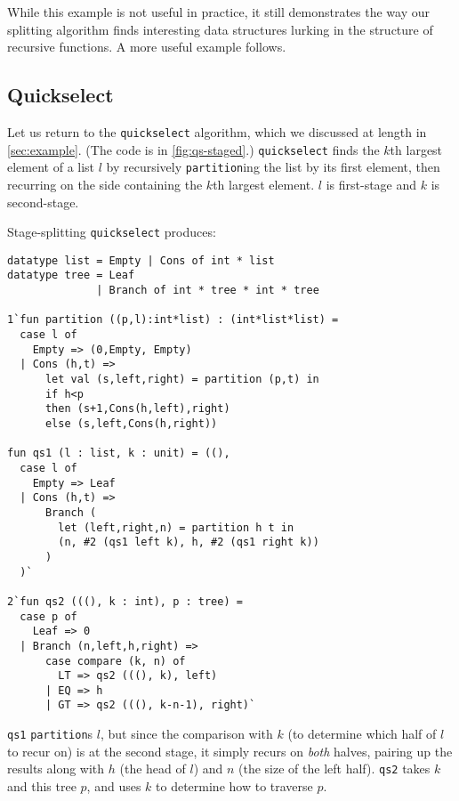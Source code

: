 While this example is not useful in practice, it still demonstrates the way our
splitting algorithm finds interesting data structures lurking in the structure
of recursive functions. A more useful example follows.


\subsection{Quickselect}

Let us return to the \texttt{quickselect} algorithm, which we discussed at
length in \ref{sec:example}. (The code is in \ref{fig:qs-staged}.)
\texttt{quickselect} finds the $k$th largest element of a list $l$ by
recursively \texttt{partition}ing the list by its first element, then recurring
on the side containing the $k$th largest element. $l$ is first-stage and $k$ is
second-stage.

Stage-splitting \texttt{quickselect} produces:
%
\begin{lstlisting} 
datatype list = Empty | Cons of int * list
datatype tree = Leaf
              | Branch of int * tree * int * tree

1`fun partition ((p,l):int*list) : (int*list*list) = 
  case l of 
    Empty => (0,Empty, Empty) 
  | Cons (h,t) => 
      let val (s,left,right) = partition (p,t) in 
      if h<p 
      then (s+1,Cons(h,left),right) 
      else (s,left,Cons(h,right))

fun qs1 (l : list, k : unit) = ((), 
  case l of
    Empty => Leaf
  | Cons (h,t) => 
      Branch (
        let (left,right,n) = partition h t in
        (n, #2 (qs1 left k), h, #2 (qs1 right k))
      )
  )`

2`fun qs2 (((), k : int), p : tree) = 
  case p of
    Leaf => 0
  | Branch (n,left,h,right) =>
      case compare (k, n) of 
        LT => qs2 (((), k), left) 
      | EQ => h 
      | GT => qs2 (((), k-n-1), right)`
\end{lstlisting}
%
\texttt{qs1} \texttt{partition}s $l$, but since the comparison with $k$ (to
determine which half of $l$ to recur on) is at the second stage, it simply
recurs on \emph{both} halves, pairing up the results along with $h$ (the head of
$l$) and $n$ (the size of the left half). \texttt{qs2} takes $k$ and this tree
$p$, and uses $k$ to determine how to traverse $p$.

